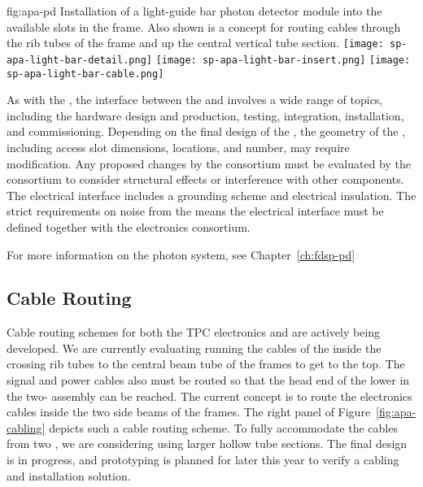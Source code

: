 \begin{dunefigure}{fig:apa-pd}
{Installation of a light-guide bar photon detector module into the available slots in the  frame. Also shown is a concept for routing  cables through the rib tubes of the  frame and up the central vertical tube section.}
\texttt{[image: sp-apa-light-bar-detail.png]}\qquad\qquad
\texttt{[image: sp-apa-light-bar-insert.png]}\qquad\qquad
\texttt{[image: sp-apa-light-bar-cable.png]}
\end{dunefigure}

As with the , the interface between the  and  involves a wide range of topics, including the hardware design and production, testing, integration, installation, and commissioning. Depending on the final design of the , the geometry of the , including access slot dimensions, locations, and number, may require modification. Any proposed changes by the  consortium must be evaluated by the  consortium to consider structural effects or interference with other components.  The electrical interface includes a grounding scheme and electrical insulation. The strict requirements on noise from the  means the electrical interface must be defined together with the \single electronics consortium. 

For more information on the photon system, see Chapter~\ref{ch:fdsp-pd} %



\subsection{Cable Routing}
\label{sec:fdsp-apa-intfc-cables}

Cable routing schemes for both the TPC electronics and  are actively being developed.  We are currently evaluating running the cables of the  inside the crossing rib tubes to the central beam tube of the  frames to get to the top.  The  signal and power cables also must be routed so that the head end of the lower  in the two- assembly can be reached. The current concept is to route the electronics cables inside the two side beams of the  frames. The right panel of Figure~\ref{fig:apa-cabling} depicts such a cable routing scheme. To fully accommodate the cables from two , %
we are considering using larger hollow tube sections. The final design is in progress, and prototyping is planned for later this year to verify a cabling and installation solution.     

